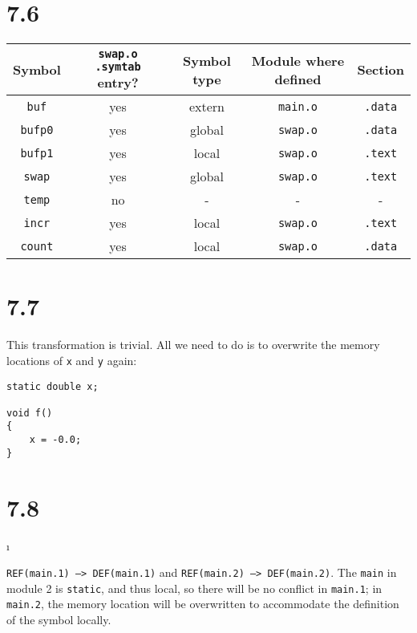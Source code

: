 \documentclass[fleqn]{article}
\begin{document}


\section{7.6}

\begin{solution}
\begin{tabular}{ c c c c c }
  Symbol & \texttt{swap.o .symtab} entry? & Symbol type & Module where defined & Section \\
  \hline
  \texttt{buf} & yes & extern & \texttt{main.o} & \texttt{.data} \\
  \texttt{bufp0} & yes & global & \texttt{swap.o} & \texttt{.data} \\
  \texttt{bufp1} & yes & local & \texttt{swap.o} & \texttt{.text} \\
  \texttt{swap} & yes & global & \texttt{swap.o} & \texttt{.text} \\
  \texttt{temp} & no & - & - \texttt{} & - \texttt{} \\
  \texttt{incr} & yes & local & \texttt{swap.o} & \texttt{.text} \\
  \texttt{count} & yes & local & \texttt{swap.o} & \texttt{.data} \\
\end{tabular}
\end{solution}

\section{7.7}

\begin{solution}
This transformation is trivial. All we need to do is to overwrite the memory locations of \texttt{x} and \texttt{y} again:
\begin{verbatim}
static double x;

void f()
{
    x = -0.0;
}
\end{verbatim}
\end{solution}

\section{7.8}

\bee

\i
\begin{solution}
\texttt{REF(main.1) --> DEF(main.1)} and \texttt{REF(main.2) --> DEF(main.2)}. The \texttt{main} in module 2 is \texttt{static}, and thus local, so there will be no conflict in \texttt{main.1}; in \texttt{main.2}, the memory location will be overwritten to accommodate the definition of the symbol locally.
\end{solution}
\end{document}

